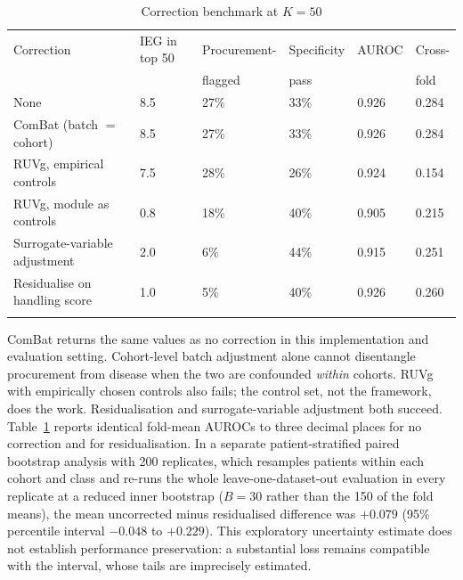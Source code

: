 \documentclass[pdflatex,sn-vancouver-num]{sn-jnl}
\theoremstyle{thmstyleone}
\theoremstyle{thmstyletwo}
\theoremstyle{thmstylethree}
\begin{document}
\begin{table}[h]
\caption{Correction benchmark at $K = 50$}\label{tab:corrections}
\begin{tabular}{@{}llllll@{}}
\toprule
Correction & IEG in top 50 & Procurement- & Specificity & AUROC & Cross- \\
           &               & flagged      & pass        &       & fold \\
\midrule
None                            & 8.5 & 27\% & 33\% & 0.926 & 0.284 \\
ComBat (batch $=$ cohort)       & 8.5 & 27\% & 33\% & 0.926 & 0.284 \\
RUVg, empirical controls        & 7.5 & 28\% & 26\% & 0.924 & 0.154 \\
RUVg, module as controls        & 0.8 & 18\% & 40\% & 0.905 & 0.215 \\
Surrogate-variable adjustment   & 2.0 & 6\%  & 44\% & 0.915 & 0.251 \\
Residualise on handling score   & 1.0 & 5\%  & 40\% & 0.926 & 0.260 \\
\botrule
\end{tabular}
\end{table}

ComBat returns the same values as no correction in this implementation and evaluation setting.
Cohort-level batch adjustment alone cannot disentangle procurement from disease when the two are
confounded \emph{within} cohorts. RUVg with
empirically chosen controls also fails; the control set, not the framework, does the work.
Residualisation and surrogate-variable adjustment both succeed. Table~\ref{tab:corrections}
reports identical fold-mean AUROCs to three decimal places for no correction and for
residualisation. In a separate patient-stratified paired bootstrap analysis with 200 replicates,
which resamples patients within each cohort and class and re-runs the whole leave-one-dataset-out
evaluation in every replicate at a reduced inner bootstrap ($B = 30$ rather than the 150 of the
fold means), the mean uncorrected minus residualised difference was $+0.079$ (95\% percentile
interval $-0.048$ to $+0.229$). This exploratory uncertainty estimate does not establish
performance preservation: a substantial loss remains compatible with the interval, whose tails are
imprecisely estimated.
\end{document}
